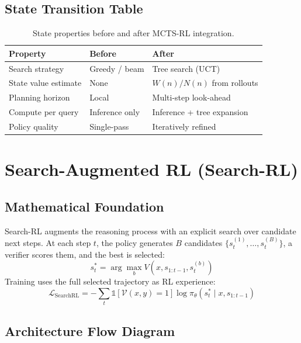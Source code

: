 \subsection{State Transition Table}
\begin{table}[h]\centering
\begin{tabular}{lll}\toprule
\textbf{Property} & \textbf{Before} & \textbf{After}\\\midrule
Search strategy & Greedy / beam & Tree search (UCT)\\
State value estimate & None & $W(n)/N(n)$ from rollouts\\
Planning horizon & Local & Multi-step look-ahead\\
Compute per query & Inference only & Inference + tree expansion\\
Policy quality & Single-pass & Iteratively refined\\\bottomrule
\end{tabular}
\caption{State properties before and after MCTS-RL integration.}
\end{table}

\newpage
\section{Search-Augmented RL (Search-RL)}

\subsection{Mathematical Foundation}
Search-RL augments the reasoning process with an explicit search over candidate next steps. At each step $t$, the policy generates $B$ candidates $\{s_t^{(1)},\ldots,s_t^{(B)}\}$, a verifier scores them, and the best is selected:
\begin{equation}
  s_t^* = \arg\max_{b} V(x, s_{1:t-1}, s_t^{(b)})
\end{equation}
Training uses the full selected trajectory as RL experience:
\begin{equation}
  \mathcal{L}_{\text{SearchRL}} = -\sum_t \mathbb{1}[\mathcal{V}(x,y) = 1]\log\pi_\theta(s_t^* \mid x, s_{1:t-1})
\end{equation}

\subsection{Architecture Flow Diagram}

